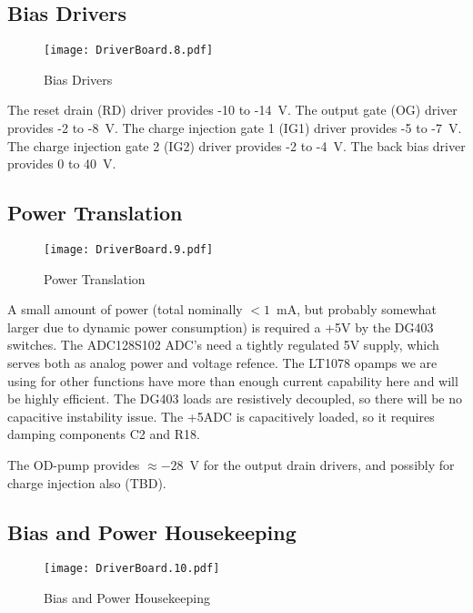 \subsection{Bias Drivers}
   \begin{figure}
   \begin{center}
   \texttt{[image: DriverBoard.8.pdf]}
   \end{center}
   \caption{Bias Drivers}
   \end{figure}
  
The reset drain (RD) driver provides -10 to -14\ V. 
The output gate (OG) driver provides -2 to -8\ V.
The charge injection gate 1 (IG1) driver provides -5 to -7\ V.
The charge injection gate 2 (IG2) driver provides -2 to -4\ V.
The back bias driver provides 0 to 40\ V.


\subsection{Power Translation}
   \begin{figure}
   \begin{center}
   \texttt{[image: DriverBoard.9.pdf]}
   \end{center}
   \caption{Power Translation}
   \end{figure}
  
A small amount of power (total nominally $<1$\ mA, but probably somewhat larger due to dynamic power consumption) is required a +5V by the DG403 switches. The ADC128S102 ADC's need a tightly regulated 5V supply, which serves both as analog power and voltage refence. The LT1078 opamps we are using for other functions have more than enough current capability here and will be highly efficient. The DG403 loads are resistively decoupled, so there will be no capacitive instability issue. The +5ADC is capacitively loaded, so it requires damping components C2 and R18.

  
The OD-pump provides $\approx -28$\ V for the output drain drivers, and possibly for charge injection also (TBD).

\subsection{Bias and Power Housekeeping}
   \begin{figure}
   \begin{center}
   \texttt{[image: DriverBoard.10.pdf]}
   \end{center}
   \caption{Bias and Power Housekeeping}
   \end{figure}

